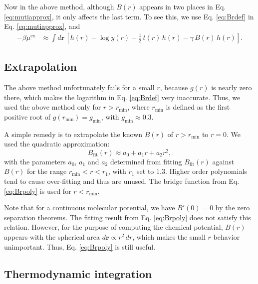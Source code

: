 \documentclass[preprint]{revtex4-1}
\newcommand{\vct}[1]{\mathbf{#1}}
\providecommand{\vr}{} %
\renewcommand{\vr}{\vct{r}}
\newcommand{\supex}[1]{ { { #1 }^{ \mathrm{ex} } } }
\newcommand{\muex}{\supex{\mu}}
\newcommand{\gmin}{g_\mathrm{min}}
\newcommand{\rmin}{r_\mathrm{min}}
\begin{document}
Now in the above method,
although $B(r)$ appears in two places in Eq. \eqref{eq:mutiapprox},
it only affects the last term.
%
To see this, we use Eq. \eqref{eq:Brdef} in Eq. \eqref{eq:mutiapprox}, and
%
\begin{align}
  -\beta \muex
  &\approx
    \int d\vr \,
    \left[
      h(r) - \log y(r) - \frac{1}{2} \, t(r) \, h(r)
      -\gamma \, B(r) \, h(r)
    \right].
  \label{eq:mutiapprox2}
\end{align}
%



\subsection{\label{sec:Brextrapolation}Extrapolation}

The above method unfortunately fails for a small $r$,
because $g(r)$ is nearly zero there,
which makes the logarithm in Eq. \eqref{eq:Brdef} very inaccurate.
%
Thus, we used the above method only for $r > \rmin$,
where $\rmin$ is defined as the first positive root of
$g(\rmin) = \gmin$, with $\gmin \approx 0.3$.


A simple remedy is to extrapolate the known $B(r)$ of $r > \rmin$ to $r = 0$.
%
We used the quadratic approximation:
\begin{equation}
  B_\mathrm{fit}(r) \approx a_0 + a_1 r + a_2 r^2,
  \label{eq:Brpoly}
\end{equation}
with the parameters $a_0$, $a_1$ and $a_2$
determined from fitting $B_\mathrm{fit}(r)$ against $B(r)$
for the range $\rmin < r < r_1$,
with $r_1$ set to 1.3.
%
Higher order polynomials tend to cause over-fitting
and thus are unused.
%
The bridge function from Eq. \eqref{eq:Brpoly} is used for $r < \rmin$.

Note that for a continuous molecular potential,
we have $B'(0) = 0$ by the zero separation theorems\cite{meeron1968, zhou1988}.
%
The fitting result from Eq. \eqref{eq:Brpoly} does not satisfy this relation.
%
However, for the purpose of computing the chemical potential,
$B(r)$ appears with the spherical area $d\vr \propto r^2 \, dr$,
which makes the small $r$ behavior unimportant.
%
Thus, Eq. \eqref{eq:Brpoly} is still useful.



\subsection{\label{sec:Brti}Thermodynamic integration}
\end{document}
